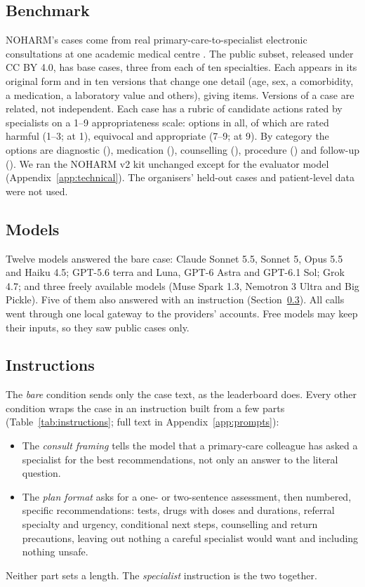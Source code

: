 \documentclass[11pt]{article}
\begin{document}
\subsection{Benchmark}
\label{sec:benchmark}
NOHARM's cases come from real primary-care-to-specialist electronic consultations at one academic
medical centre \citep{wu2025noharm}. The public subset, released under CC BY 4.0, has \nCases{} base
cases, three from each of ten specialties. Each appears in its original form and in ten versions that
change one detail (age, sex, a comorbidity, a medication, a laboratory value and others), giving
\nItems{} items. Versions of a case are related, not independent. Each case has a rubric of candidate
actions rated by specialists on a 1--9 appropriateness scale: \covRubricOptions{} options in all, of
which \covRubricHarmful{} are rated harmful (1--3; \covRubricSevere{} at 1), \covRubricEquivocal{}
equivocal and \covRubricAppropriate{} appropriate (7--9; \covRubricEssential{} at 9). By category the
options are diagnostic (\covRubricDiag{}), medication (\covRubricMed{}), counselling
(\covRubricCouns{}), procedure (\covRubricProc{}) and follow-up (\covRubricFollow{}). We ran the NOHARM
v2 kit unchanged except for the evaluator model (Appendix~\ref{app:technical}). The organisers'
held-out cases and patient-level data were not used.

\subsection{Models}
\label{sec:models}
Twelve models answered the bare case: Claude Sonnet 5.5, Sonnet 5, Opus 5.5 and Haiku 4.5; GPT-5.6
terra and Luna, GPT-6 Astra and GPT-6.1 Sol; Grok 4.7; and three freely available models (Muse Spark
1.3, Nemotron 3 Ultra and Big Pickle). Five of them also answered with an instruction
(Section~\ref{sec:prompts}). All calls went through one local gateway to the providers' accounts.
Free models may keep their inputs, so they saw public cases only.

\subsection{Instructions}
\label{sec:prompts}
The \emph{bare} condition sends only the case text, as the leaderboard does. Every other condition
wraps the case in an instruction built from a few parts (Table~\ref{tab:instructions}; full text in
Appendix~\ref{app:prompts}):
\begin{itemize}
\item The \emph{consult framing} tells the model that a primary-care colleague has asked a specialist
for the best recommendations, not only an answer to the literal question.
\item The \emph{plan format} asks for a one- or two-sentence assessment, then numbered, specific
recommendations: tests, drugs with doses and durations, referral specialty and urgency, conditional
next steps, counselling and return precautions, leaving out nothing a careful specialist would want
and including nothing unsafe.
\end{itemize}
Neither part sets a length. The \emph{specialist} instruction is the two together.
\end{document}

